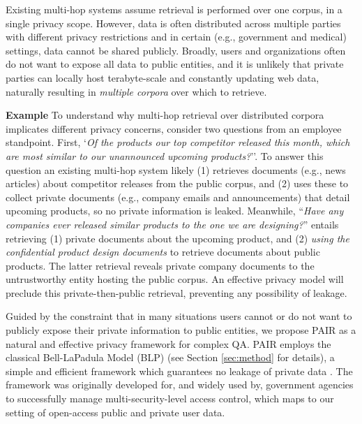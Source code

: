 \documentclass{article}
\renewcommand\cite{\citep}	\newcommand\shortcite{\citeyearpar}\newcommand\newcite{\citet}
\newcommand{\problemshortname}{\textsc{PAIR}\xspace}
\begin{document}
Existing multi-hop systems assume retrieval is performed over one corpus, in a single privacy scope. However, data is often distributed across multiple parties with different privacy restrictions and in certain (e.g., government and medical) settings, data cannot be shared publicly. Broadly, users and organizations often do not want to expose all data to public entities, and it is unlikely that private parties can locally host terabyte-scale and constantly updating web data, naturally resulting in \textit{multiple corpora} over which to retrieve.



\textbf{Example} To understand why multi-hop retrieval over distributed corpora implicates different privacy concerns, consider two questions 
from an employee standpoint. First, `\textit{Of the products our top competitor released this month, which are most similar to our unannounced upcoming products?}''. To answer this question an existing multi-hop system likely (1) retrieves documents (e.g., news articles) about competitor releases from the public corpus, and (2) uses these to collect private documents (e.g., company emails and announcements) that detail upcoming products, so no private information is leaked. Meanwhile, ``\textit{Have any companies ever released similar products to the one we are designing?}'' entails retrieving (1) private documents about the upcoming product, and (2) \textit{using the confidential product design documents} to retrieve documents about public products. The latter retrieval reveals private company documents to the untrustworthy entity hosting the public corpus. An effective privacy model will preclude this private-then-public retrieval, preventing any possibility of leakage. 


Guided by the constraint that in many situations users cannot or do not want to publicly expose their private information to public entities, we propose \problemshortname as a natural and effective privacy framework for complex QA. \problemshortname employs the classical Bell-LaPadula Model (BLP) (see Section \ref{sec:method} for details), a simple and efficient framework which guarantees no leakage of private data \cite{bell2976blm}. The framework was originally developed for, and widely used by, government agencies to successfully manage multi-security-level access control,
which maps to our setting of open-access public and private user data. 
\end{document}
